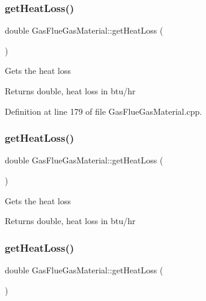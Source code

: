 \subsubsection{\texorpdfstring{get\+Heat\+Loss()}{getHeatLoss()}\hspace{0.1cm}{\footnotesize\ttfamily [1/3]}}
{\footnotesize\ttfamily double Gas\+Flue\+Gas\+Material\+::get\+Heat\+Loss (\begin{DoxyParamCaption}{ }\end{DoxyParamCaption})}

Gets the heat loss

\begin{DoxyReturn}{Returns}
double, heat loss in btu/hr 
\end{DoxyReturn}


Definition at line 179 of file Gas\+Flue\+Gas\+Material.\+cpp.

\mbox{\label{class_gas_flue_gas_material_ad9990d400536c6e8c7c53b9212de400b}} 
\subsubsection{\texorpdfstring{get\+Heat\+Loss()}{getHeatLoss()}\hspace{0.1cm}{\footnotesize\ttfamily [2/3]}}
{\footnotesize\ttfamily double Gas\+Flue\+Gas\+Material\+::get\+Heat\+Loss (\begin{DoxyParamCaption}{ }\end{DoxyParamCaption})}

Gets the heat loss

\begin{DoxyReturn}{Returns}
double, heat loss in btu/hr 
\end{DoxyReturn}
\mbox{\label{class_gas_flue_gas_material_ad9990d400536c6e8c7c53b9212de400b}} 
\subsubsection{\texorpdfstring{get\+Heat\+Loss()}{getHeatLoss()}\hspace{0.1cm}{\footnotesize\ttfamily [3/3]}}
{\footnotesize\ttfamily double Gas\+Flue\+Gas\+Material\+::get\+Heat\+Loss (\begin{DoxyParamCaption}{ }\end{DoxyParamCaption})}


